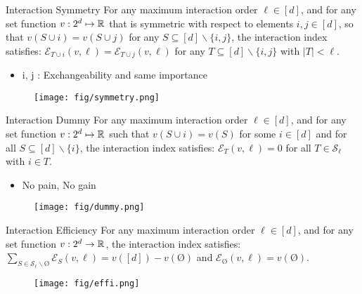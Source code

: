 \documentclass[10pt]{beamer}
\newcommand{\f}{v}
\newcommand{\ex}{\Expl}
\def\Expl{\mathcal{E}}
\begin{document}
\begin{frame}
    \begin{myaxiombox}{Interaction Symmetry}
        For any maximum interaction order $\ell \in [d]$, and for any set function $\f:2^d \mapsto \R$ that is symmetric with respect to elements $i, j \in [d]$, so that
$\f(S \! \cup  i) = \f(S \! \cup  j) \!$ for any $S \subseteq [d] \backslash \{i,j\}$, the interaction index satisfies: $\ex_{T \cup i}(\f,\ell) = \ex_{ T \cup j}(\f,\ell)$ for any $T \subseteq [d] \backslash \{i,j\}$ with $|T| < \ell$.
    \end{myaxiombox}
    \begin{itemize}[label=\scalebox{0.5}{$\blacksquare$}]
        \item i, j : Exchangeability and same importance
    \end{itemize}
\end{frame}
\begin{frame}
    \begin{figure}[h]
    \centering
    \texttt{[image: fig/symmetry.png]}
    \end{figure}
\end{frame}

\begin{frame}
    \begin{myaxiombox}{Interaction Dummy}
        For any maximum interaction order $\ell \in [d]$, and for any set function $\f:2^d \mapsto \R$ such that $\f(S \cup i) = \f(S)$ for some $i \in [d]$ and for all $ S \subseteq [d] \backslash \{i\}$, the interaction index satisfies:  $\ex_{T}(\f, \ell) = 0$ for all $T \in \mathcal{S}_\ell$ with $i \in T$.
    \end{myaxiombox}
    \begin{itemize}[label=\scalebox{0.5}{$\blacksquare$}]
        \item No pain, No gain
    \end{itemize}
\end{frame}
\begin{frame}
    \begin{figure}[h]
    \centering
    \texttt{[image: fig/dummy.png]}
    \end{figure}
\end{frame}

\begin{frame}
    \begin{myaxiombox}{Interaction Efficiency}
        For any maximum interaction order $\ell \in [d]$, and for any set function $\f:2^d \rightarrow \R$, the interaction index satisfies: $\sum_{S \in \mathcal{S}_\ell\backslash\text{\O}} \ex_S(\f,\ell) = \f([d]) - \f(\text{\O})$ and $\ex_{\text{\O}}(\f,\ell) = \f(\text{\O})$.
    \end{myaxiombox}
\end{frame}
\begin{frame}
    \begin{figure}[h]
    \centering
    \texttt{[image: fig/effi.png]}
    \end{figure}
\end{frame}
\end{document}
